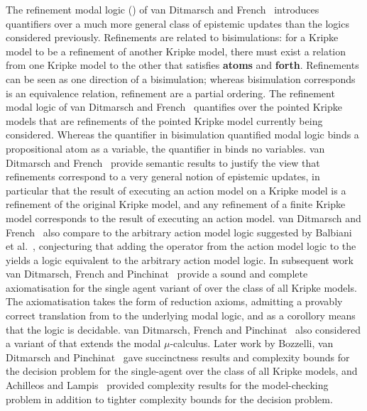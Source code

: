 The refinement modal logic (\logicRml{}) of van Ditmarsch and French~\cite{vanditmarsch:2009} introduces quantifiers over a much more general class of epistemic updates than the logics considered previously.
Refinements are related to bisimulations: for a Kripke model to be a refinement of another Kripke model, there must exist a relation from one Kripke model to the other that satisfies {\bf atoms} and {\bf forth}.
Refinements can be seen as one direction of a bisimulation; whereas bisimulation corresponds is an equivalence relation, refinement are a partial ordering.
The refinement modal logic of van Ditmarsch and French~\cite{vanditmarsch:2009} quantifies over the pointed Kripke models that are refinements of the pointed Kripke model currently being considered.
Whereas the quantifier in bisimulation quantified modal logic binds a propositional atom as a variable, the quantifier in \logicRml{} binds no variables.
van Ditmarsch and French~\cite{vanditmarsch:2009} provide semantic results to justify the view that refinements correspond to a very general notion of epistemic updates, in particular that the result of executing an action model on a Kripke model is a refinement of the original Kripke model, and any refinement of a finite Kripke model corresponds to the result of executing an action model.
van Ditmarsch and French~\cite{vanditmarsch:2009} also compare \logicRml{} to the arbitrary action model logic suggested by Balbiani et al.~\cite{balbiani:2007}, conjecturing that adding the operator from the action model logic to the \logicRml{} yields a logic equivalent to the arbitrary action model logic.
In subsequent work van Ditmarsch, French and Pinchinat~\cite{vanditmarsch:2010} provide a sound and complete axiomatisation for the single agent variant of \logicRml{} over the class of all Kripke models.
The axiomatisation takes the form of reduction axioms, admitting a provably correct translation from \logicRml{} to the underlying modal logic, and as a corollory means that the logic is decidable.
van Ditmarsch, French and Pinchinat~\cite{vanditmarsch:2010} also considered a variant of \logicRml{} that extends the modal $\mu$-calculus.
Later work by Bozzelli, van Ditmarsch and Pinchinat~\cite{bozzelli:2014a} gave succinctness results and complexity bounds for the decision problem for the single-agent \logicRml{} over the class of all Kripke models, and Achilleos and Lampis~\cite{achilleos:2013} provided complexity results for the model-checking problem in addition to tighter complexity bounds for the decision problem.
